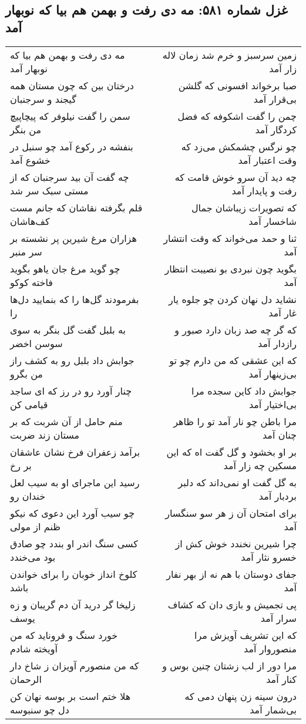 \begin{center}
\section*{غزل شماره ۵۸۱: مه دی رفت و بهمن هم بیا که نوبهار آمد}
\label{sec:0581}
\begin{longtable}{l p{0.5cm} r}
مه دی رفت و بهمن هم بیا که نوبهار آمد
&&
زمین سرسبز و خرم شد زمان لاله زار آمد
\\
درختان بین که چون مستان همه گیجند و سرجنبان
&&
صبا برخواند افسونی که گلشن بی‌قرار آمد
\\
سمن را گفت نیلوفر که پیچاپیچ من بنگر
&&
چمن را گفت اشکوفه که فضل کردگار آمد
\\
بنفشه در رکوع آمد چو سنبل در خشوع آمد
&&
چو نرگس چشمکش می‌زد که وقت اعتبار آمد
\\
چه گفت آن بید سرجنبان که از مستی سبک سر شد
&&
چه دید آن سرو خوش قامت که رفت و پایدار آمد
\\
قلم بگرفته نقاشان که جانم مست کف‌هاشان
&&
که تصویرات زیباشان جمال شاخسار آمد
\\
هزاران مرغ شیرین پر نشسته بر سر منبر
&&
ثنا و حمد می‌خواند که وقت انتشار آمد
\\
چو گوید مرغ جان یاهو بگوید فاخته کوکو
&&
بگوید چون نبردی بو نصیبت انتظار آمد
\\
بفرمودند گل‌ها را که بنمایید دل‌ها را
&&
نشاید دل نهان کردن چو جلوه یار غار آمد
\\
به بلبل گفت گل بنگر به سوی سوسن اخضر
&&
که گر چه صد زبان دارد صبور و رازدار آمد
\\
جوابش داد بلبل رو به کشف راز من بگرو
&&
که این عشقی که من دارم چو تو بی‌زینهار آمد
\\
چنار آورد رو در رز که ای ساجد قیامی کن
&&
جوابش داد کاین سجده مرا بی‌اختیار آمد
\\
منم حامل از آن شربت که بر مستان زند ضربت
&&
مرا باطن چو نار آمد تو را ظاهر چنان آمد
\\
برآمد زعفران فرخ نشان عاشقان بر رخ
&&
بر او بخشود و گل گفت اه که این مسکین چه زار آمد
\\
رسید این ماجرای او به سیب لعل خندان رو
&&
به گل گفت او نمی‌داند که دلبر بردبار آمد
\\
چو سیب آورد این دعوی که نیکو ظنم از مولی
&&
برای امتحان آن ز هر سو سنگسار آمد
\\
کسی سنگ اندر او بندد چو صادق بود می‌خندد
&&
چرا شیرین نخندد خوش کش از خسرو نثار آمد
\\
کلوخ انداز خوبان را برای خواندن باشد
&&
جفای دوستان با هم نه از بهر نفار آمد
\\
زلیخا گر درید آن دم گریبان و زه یوسف
&&
پی تجمیش و بازی دان که کشاف سرار آمد
\\
خورد سنگ و فروناید که من آویخته شادم
&&
که این تشریف آویزش مرا منصوروار آمد
\\
که من منصورم آویزان ز شاخ دار الرحمان
&&
مرا دور از لب زشتان چنین بوس و کنار آمد
\\
هلا ختم است بر بوسه نهان کن دل چو سنبوسه
&&
درون سینه زن پنهان دمی که بی‌شمار آمد
\\
\end{longtable}
\end{center}

